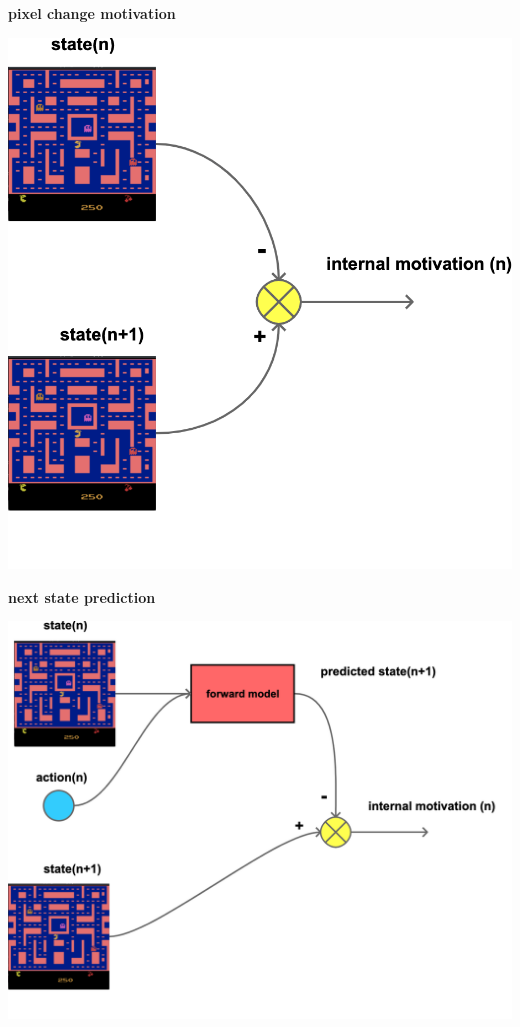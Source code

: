 \documentclass[xcolor=dvipsnames]{beamer}
\begin{document}
\begin{frame}{\bf pixel change motivation}

\centering
\includegraphics[scale=0.15]{../diagrams/internal_motivation/pixelchange.png}

\end{frame}


\begin{frame}{\bf next state prediction}

\centering
\includegraphics[scale=0.15]{../diagrams/internal_motivation/naive.png}

\end{frame}
\end{document}
